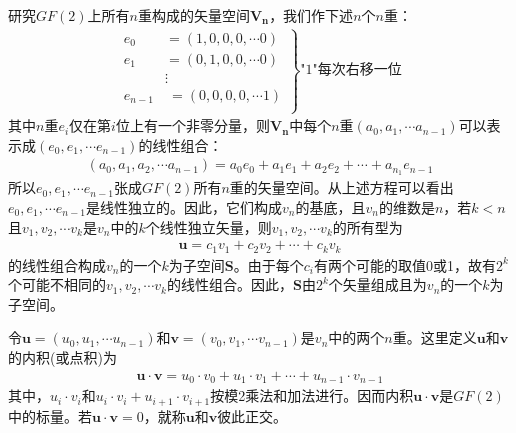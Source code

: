 研究$GF(2)$上所有$n$重构成的矢量空间$\mathbf{V_n}$，我们作下述$n\mbox{个}n$重：
\begin{eqnarray}
\left.
\begin{array}{ll}
  e_0~&=(1,0,0,0,\cdots 0)\\
  e_1~&=(0,1,0,0,\cdots 0)\\
  &\vdots\\
  e_{n-1}&\:=(0,0,0,0,\cdots 1)\\
\end{array}
\right\}\mbox{"1"每次右移一位}
\end{eqnarray}
其中$n$重$e_i$仅在第$i$位上有一个非零分量，则$\mathbf{V_n}$中每个$n$重$(a_0,a_1,\cdots
a_{n-1})$可以表示成$(e_0,e_1,\cdots e_{n-1})$的线性组合：
\begin{eqnarray}
(a_0,a_1,a_2,\cdots a_{n-1})=a_0e_0+a_1e_1+a_2e_2+\cdots +a_{n_1}e_{n-1}
\end{eqnarray}
所以$e_0,e_1,\cdots
e_{n-1}$张成$GF(2)$所有$n$重的矢量空间。从上述方程可以看出$e_0,e_1,\cdots
e_{n-1}$是线性独立的。因此，它们构成$v_n$的基底，且$v_n$的维数是$n$，若$k<n$且$v_1,v_2,\cdots
v_k$是$v_n$中的$k$个线性独立矢量，则$v_1,v_2,\cdots v_k$的所有型为
\begin{eqnarray}
  \mathbf{u}=c_1v_1+c_2v_2+\cdots +c_kv_k
  \label{}
\end{eqnarray}
的线性组合构成$v_n$的一个$k$为子空间$\mathbf{S}$。由于每个$c_i$有两个可能的取值0或1，故有$2^k$个可能不相同的$v_1,v_2,\cdots
v_k$的线性组合。因此，$\mathbf{S}$由$2^k$个矢量组成且为$v_n$的一个$k$为子空间。

令$\mathbf{u}=(u_0,u_1,\cdots u_{n-1})$和$\mathbf{v}=(v_0,v_1,\cdots
v_{n-1})$是$v_n$中的两个$n$重。这里定义$\mathbf{u}\mbox{和}\mathbf{v}$的内积(或点积)为
\begin{eqnarray}
  \mathbf{u}\cdot\mathbf{v}=u_0\cdot v_0+u_1\cdot v_1+\cdots+u_{n-1}\cdot
  v_{n-1}
  \label{}
\end{eqnarray}
其中，$u_i\cdot v_i\mbox{和}u_i\cdot v_i+u_{i+1}\cdot
v_{i+1}$按模2乘法和加法进行。因而内积$\mathbf{u}\cdot\mathbf{v}$是$GF(2)$中的标量。若$\mathbf{u}\cdot\mathbf{v}=0$，就称$\mathbf{u}\mbox{和}\mathbf{v}$彼此正交。


